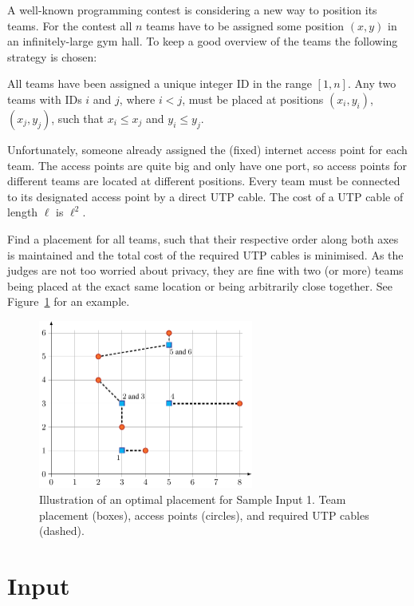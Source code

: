 
A well-known programming contest is considering a new way to position its teams.
For the contest all $n$ teams have to be assigned some position $(x,y)$ in an infinitely-large gym hall.
To keep a good overview of the teams the following strategy is chosen:

All teams have been assigned a unique integer ID in the range $[1,n]$.
Any two teams with IDs $i$ and $j$, where $i<j$, must be placed at positions $(x_i,y_i)$, $(x_j,y_j)$, such that $x_i \le x_j$ and $y_i \le y_j$.

Unfortunately, someone already assigned the (fixed) internet access point for each team.
The access points are quite big and only have one port, so access points for different teams are located at different positions.
Every team must be connected to its designated access point by a direct UTP cable.
The cost of a UTP cable of length $\ell$ is $\ell^2$.

Find a placement for all teams, such that their respective order along both axes is maintained and the total cost of the required UTP cables is minimised.
As the judges are not too worried about privacy, they are fine with two (or more) teams being placed at the exact same location or being arbitrarily close together.  See Figure~\ref{fig:contest} for an example.

\begin{figure}[h!]
  \centering
  \includegraphics[width=0.63\textwidth]{figure}
  \caption{Illustration of an optimal placement for Sample Input 1. Team placement (boxes), access points (circles), and required UTP cables (dashed).}
  \label{fig:contest}
\end{figure}

\section*{Input}

